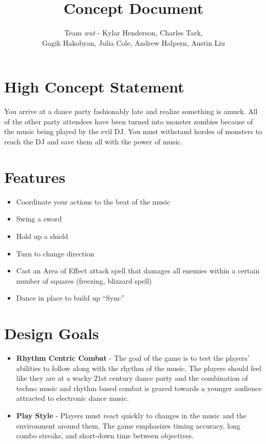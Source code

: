 \documentclass[]{article}
\begin{document}
\title{Concept Document}
\author{Team \emph{wut} - Kylar Henderson, Charles Tark,\\ 
Gagik Hakobyan, Julia Cole, Andrew Halpern, Austin Liu}
\maketitle

\section*{High Concept Statement}
You arrive at a dance party fashionably late and realize something is
amuck. All of the other party attendees have been turned into monster
zombies because of the music being played by the evil DJ. You must
withstand hordes of monsters to reach the DJ and save them all with
the power of music.

\section*{Features}
\begin{itemize}
\item 
  Coordinate your actions to the beat of the music
\item 
  Swing a sword
\item 
  Hold up a shield
\item 
  Turn to change direction
\item 
  Cast an Area of Effect attack spell that damages all 
  enemies within a certain number of squares (freezing, blizzard spell)
\item 
  Dance in place to build up “Sync”
\end{itemize}

\section*{Design Goals}
\begin{itemize}
\item
  \textbf{Rhythm Centric Combat} - The goal of the game is to test the
  players’ abilities to follow along with the rhythm of the music. The
  players should feel like they are at a wacky 21st century dance party
  and the combination of techno music and rhythm based combat is geared
  towards a younger audience attracted to electronic dance music.
\item
  \textbf{Play Style} - Players must react quickly to changes in the
  music and the environment around them. The game emphasizes timing
  accuracy, long combo streaks, and short-down time between objectives.
\end{itemize}
\end{document}
